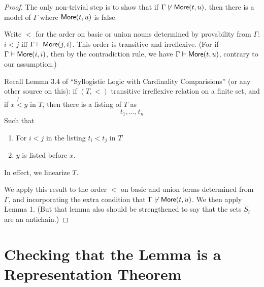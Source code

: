 \documentclass[12pt]{article}
\theoremstyle{definition}
\newcommand{\proves}{\vdash}
\begin{document}
\begin{proof}
The only non-trivial step is to show that if 
$\Gamma\not\proves \more(t,u)$, then there is a model of $\Gamma$
where $\mbox{\sf More}(t,u)$ is false.

Write $<$ for the order on basic or union nouns determined by provability from
$\Gamma$:  $i < j$ iff $\Gamma\proves \more(j,i)$.
This order is transitive and irreflexive.   (For if $\Gamma\proves\more(i,i)$,
then by the contradiction rule,  we have $\Gamma\proves \more(t,u)$, 
contrary to our assumption.)

Recall Lemma 3.4 of ``Syllogistic Logic with Cardinality Comparisions'' 
(or any other source on this): if $(T, <)$ transitive irreflexive relation
on a finite set,
and if $x \not{<} y$ in $T$, then there is a listing of $T$ as 
\[ t_1, \ldots, t_n \]
Such that 
\begin{enumerate}
    \item For $i < j$ in the listing $t_i < t_j$ in $T$
    \item $y$ is listed before $x$.
\end{enumerate}
In effect, we linearize $T$.

We apply this result to the order $<$ on 
basic and union terms determined from $\Gamma$, 
and incorporating the extra condition that 
$\Gamma\not\proves \more(t,u)$.
We then apply Lemma 1.  (But that lemma also should be strengthened
to say that the sets $S_i$ are an antichain.)
\end{proof}


\section{Checking that the Lemma is a Representation Theorem}

% 
\newcommand{\provsub}{\subseteq_{\Gamma}}
\newcommand{\provle}{\le_{\Gamma}}
\newcommand{\provlt}{<_{\Gamma}}

\newcommand{\nprovle}{\nleq_{\Gamma}}
\newcommand{\provextended}{\preceq_{\Gamma}}
\newcommand{\provextendedstrict}{\prec_{\Gamma}}
\newcommand{\nprovextended}{\npreceq_{\Gamma}}
\end{document}
